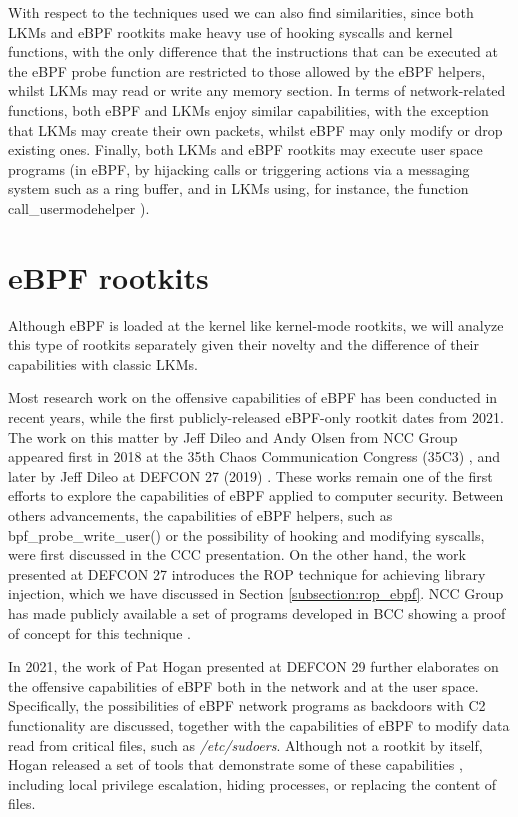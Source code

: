 With respect to the techniques used we can also find similarities, since
both LKMs and eBPF rootkits make heavy use of hooking syscalls and kernel
functions, with the only difference that the instructions that can be
executed at the eBPF probe function are restricted to those allowed by
the eBPF helpers, whilst LKMs may read or write any memory section. In
terms of network-related functions, both eBPF and LKMs enjoy similar
capabilities, with the exception that LKMs may create their own packets,
whilst eBPF may only modify or drop existing ones. Finally, both LKMs and
eBPF rootkits may execute user space programs (in eBPF, by hijacking calls
or triggering actions via a messaging system such as a ring buffer, and in
LKMs using, for instance, the function call\_usermodehelper
\cite{usermode_helper_lkm}).


\section{eBPF rootkits}
Although eBPF is loaded at the kernel like kernel-mode rootkits, we will
analyze this type of rootkits separately given their novelty and the
difference of their capabilities with classic LKMs.

Most research work on the offensive capabilities of eBPF has been conducted
in recent years, while the first publicly-released eBPF-only rootkit dates
from 2021. The work on this matter by Jeff Dileo and Andy Olsen from NCC
Group appeared first in 2018 at the 35th Chaos Communication Congress
(35C3) \cite{god_ebpf}, and later by Jeff Dileo at DEFCON 27 (2019)
\cite{evil_ebpf}. These works remain one of the first efforts to explore
the capabilities of eBPF applied to computer security. Between others
advancements, the capabilities of eBPF helpers, such as
bpf\_probe\_write\_user() or the possibility of hooking and modifying
syscalls, were first discussed in the CCC presentation. On the other
hand, the work presented at DEFCON 27 introduces the ROP technique for
achieving library injection, which we have discussed in Section
\ref{subsection:rop_ebpf}. NCC Group has made publicly available a set of
programs developed in BCC showing a proof of concept for this technique
\cite{evil_ebpf_github}.

In 2021, the work of Pat Hogan presented at DEFCON 29 \cite{bad_ebpf}
further elaborates on the offensive capabilities of eBPF both in the
network and at the user space. Specifically, the possibilities of eBPF
network programs as backdoors with C2 functionality are discussed, together
with the capabilities of eBPF to modify data read from critical files, such
as \textit{/etc/sudoers}. Although not a rootkit by itself, Hogan released
a set of tools that demonstrate some of these capabilities
\cite{bad_ebpf_github}, including local privilege escalation, hiding
processes, or replacing the content of files.

